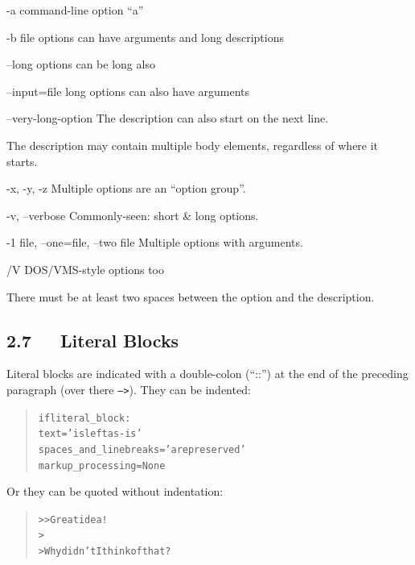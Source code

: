 \documentclass[a4paper]{article}
\begin{document}
\begin{DUoptionlist}
\item[-a]  command-line option “a”

\item[-b file]  options can have arguments
and long descriptions

\item[--long]  options can be long also

\item[--input=file]  long options can also have
arguments

\item[--very-long-option]  The description can also start on the next line.

The description may contain multiple body elements,
regardless of where it starts.

\item[-x, -y, -z]  Multiple options are an “option group”.

\item[-v, --verbose]  Commonly-seen: short \& long options.

\item[-1 file, --one=file, --two file]  Multiple options with arguments.

\item[/V]  DOS/VMS-style options too
\end{DUoptionlist}

There must be at least two spaces between the option and the
description.


\subsection{2.7   Literal Blocks%
  \label{literal-blocks}%
}

Literal blocks are indicated with a double-colon (“::”) at the end of
the preceding paragraph (over there \texttt{-->}).  They can be indented:

\begin{quote}
\begin{alltt}
if literal_block:
    text = 'is left as-is'
    spaces_and_linebreaks = 'are preserved'
    markup_processing = None
\end{alltt}
\end{quote}

Or they can be quoted without indentation:

\begin{quote}
\begin{alltt}
>> Great idea!
>
> Why didn't I think of that?
\end{alltt}
\end{quote}
\end{document}
